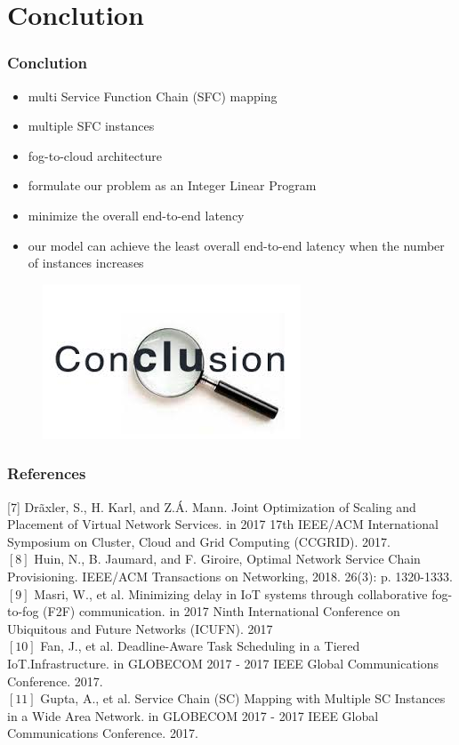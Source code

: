 \documentclass{beamer}
\begin{document}
\section{Conclution}
\begin{frame}
\frametitle{Conclution}
	\begin{itemize}
		\item {multi Service
		Function Chain (SFC) mapping}
		\item {multiple SFC instances}
		\item {fog-to-cloud architecture}
		\item {formulate our problem as an Integer Linear
			Program}
		\item {minimize the overall end-to-end latency}
		\item {our model can achieve the least overall end-to-end latency
			when the number of instances increases}
	\end{itemize}
\begin{figure}
	\centering
	\includegraphics[width=0.7\linewidth]{conclution}
	\caption{}
	\label{fig:conclution}
\end{figure}

\end{frame}
\begin{frame}
\frametitle{References}
[7] Drãxler, S., H. Karl, and Z.Á. Mann. Joint Optimization of Scaling and
Placement of Virtual Network Services. in 2017 17th IEEE/ACM
International Symposium on Cluster, Cloud and Grid Computing
(CCGRID). 2017.\\
$[8]$ Huin, N., B. Jaumard, and F. Giroire, Optimal Network Service Chain
Provisioning. IEEE/ACM Transactions on Networking, 2018. 26(3): p.
1320-1333.\\
$[9]$ Masri, W., et al. Minimizing delay in IoT systems through collaborative
fog-to-fog (F2F) communication. in 2017 Ninth International
Conference on Ubiquitous and Future Networks (ICUFN). 2017\\
$[10]$ Fan, J., et al. Deadline-Aware Task Scheduling in a Tiered IoT.Infrastructure. in GLOBECOM 2017 - 2017 IEEE Global Communications Conference. 2017.\\
$[11]$ Gupta, A., et al. Service Chain (SC) Mapping with Multiple SC
Instances in a Wide Area Network. in GLOBECOM 2017 - 2017 IEEE
Global Communications Conference. 2017.
\end{frame}
\end{document}
